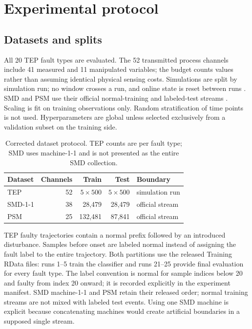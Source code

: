 \documentclass[12pt]{article}
\begin{document}
\section{Experimental protocol}

\subsection{Datasets and splits}

All 20 TEP fault types are evaluated. The 52 transmitted process channels
include 41 measured and 11 manipulated variables; the budget counts values
rather than assuming identical physical sensing costs. Simulations are split by simulation run;
no window crosses a run, and online state is reset between runs
\cite{downs1993tep,rieth2017tep}. SMD
and PSM use their official normal-training and labeled-test streams
\cite{su2019omnianomaly,abdulaal2021ransyn}. Scaling is
fit on training observations only. Random stratification of time points is not
used. Hyperparameters are global unless selected exclusively from a validation
subset on the training side.

\begin{table}[t]
\centering
\caption{Corrected dataset protocol. TEP counts are per fault type; SMD uses
machine-1-1 and is not presented as the entire SMD collection.}
\begin{tabular}{@{}lrrrl@{}}
\toprule
Dataset & Channels & Train & Test & Boundary \\
\midrule
TEP & 52 & $5\times500$ & $5\times500$ & simulation run \\
SMD-1-1 & 38 & 28,479 & 28,479 & official stream \\
PSM & 25 & 132,481 & 87,841 & official stream \\
\bottomrule
\end{tabular}
\label{tab:datasets}
\end{table}

TEP faulty trajectories contain a normal prefix followed by an introduced
disturbance. Samples before onset are labeled normal instead of assigning the
fault label to the entire trajectory. Both partitions use the released Training RData files: runs 1--5 train the
classifier and runs 21--25 provide final evaluation for every fault type.
The label convention is normal for sample indices below 20 and faulty from
index 20 onward; it is recorded explicitly in the experiment manifest. SMD machine-1-1 and
PSM retain their released order; normal training streams are not mixed with
labeled test events. Using one SMD machine is explicit because concatenating
machines would create artificial boundaries in a supposed single stream.
\end{document}

